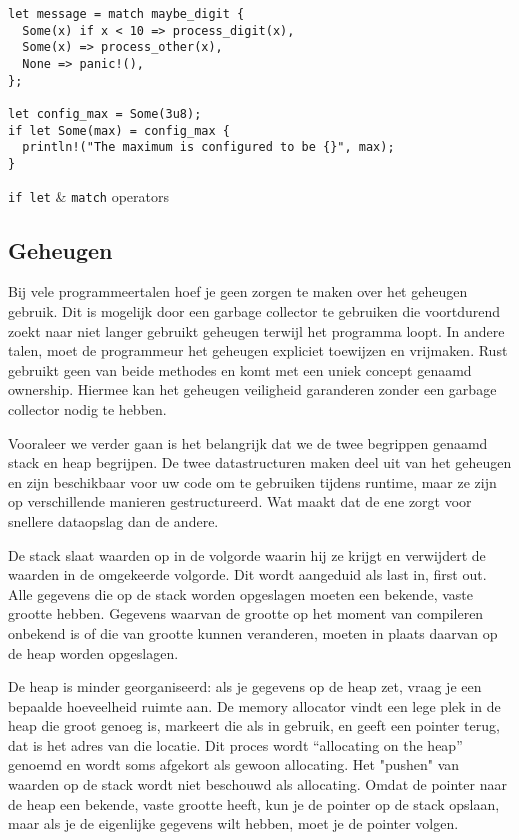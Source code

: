 \begin{listing}[h]
\begin{verbatim}
let message = match maybe_digit {
  Some(x) if x < 10 => process_digit(x),
  Some(x) => process_other(x),
  None => panic!(),
};

let config_max = Some(3u8);
if let Some(max) = config_max {
  println!("The maximum is configured to be {}", max);
}
\end{verbatim}
\caption{\texttt{if let} \& \texttt{match} operators}
\end{listing}

\clearpage

\subsection{Geheugen}

Bij vele programmeertalen hoef je geen zorgen te maken over het geheugen gebruik. Dit is mogelijk
door een garbage collector te gebruiken die voortdurend zoekt naar niet langer gebruikt geheugen
terwijl het programma loopt. In andere talen, moet de programmeur het geheugen expliciet toewijzen
en vrijmaken. Rust gebruikt geen van beide methodes en komt met een uniek concept genaamd ownership.
Hiermee kan het geheugen veiligheid garanderen zonder een garbage collector nodig te hebben. 

Vooraleer we verder gaan is het belangrijk dat we de twee begrippen genaamd stack en heap begrijpen.
De twee datastructuren maken deel uit van het geheugen en zijn beschikbaar voor uw code om te
gebruiken tijdens runtime, maar ze zijn op verschillende manieren gestructureerd. Wat maakt dat de
ene zorgt voor snellere dataopslag dan de andere. 

De stack slaat waarden op in de volgorde waarin hij ze krijgt en verwijdert de waarden in de
omgekeerde volgorde. Dit wordt aangeduid als last in, first out. Alle gegevens die op de stack
worden opgeslagen moeten een bekende, vaste grootte hebben. Gegevens waarvan de grootte op het
moment van compileren onbekend is of die van grootte kunnen veranderen, moeten in plaats daarvan op
de heap worden opgeslagen. 

De heap is minder georganiseerd: als je gegevens op de heap zet, vraag je een bepaalde hoeveelheid
ruimte aan. De memory allocator vindt een lege plek in de heap die groot genoeg is, markeert die als
in gebruik, en geeft een pointer terug, dat is het adres van die locatie. Dit proces wordt
“allocating on the heap” genoemd en wordt soms afgekort als gewoon allocating. Het "pushen" van
waarden op de stack wordt niet beschouwd als allocating. Omdat de pointer naar de heap een bekende,
vaste grootte heeft, kun je de pointer op de stack opslaan, maar als je de eigenlijke gegevens wilt
hebben, moet je de pointer volgen. 

